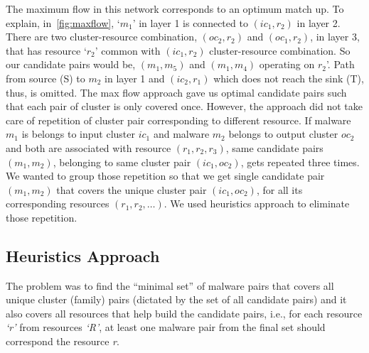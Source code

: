 The maximum flow in this network corresponds to an optimum match up.
To explain, in~\autoref{fig:maxflow}, `$m_1$' in layer 1 is connected to $(ic_1,r_2)$ in layer 2.
There are two cluster-resource combination, $(oc_2,r_2)$ and $(oc_1,r_2)$, in layer 3, that has resource `$r_2$' common with $(ic_1,r_2)$ cluster-resource combination.
So our candidate pairs would be, $(m_1,m_5)$ and $(m_1,m_4)$ operating on $r_2$'.
Path from source (S) to $m_2$ in layer 1 and $(ic_2,r_1)$ which does not reach the sink (T), thus, is omitted.
The max flow approach gave us optimal candidate pairs such that each pair of cluster is only covered once.
However, the approach did not take care of repetition of cluster pair corresponding to different resource.
If malware $m_1$ is belongs to input cluster $ic_1$ and malware $m_2$ belongs to output cluster $oc_2$ and both are associated with resource $(r_1,r_2,r_3)$, same candidate pairs $(m_1,m_2)$, belonging to same cluster pair $(ic_1,oc_2)$, gets repeated three times.
We wanted to group those repetition so that we get single candidate pair $(m_1,m_2)$ that covers the unique cluster pair $(ic_1,oc_2)$, for all its corresponding resources $(r_1,r_2,\ldots)$.
We used heuristics approach to eliminate those repetition.
\subsection{Heuristics Approach}
\label{sub:Heuristics Approach}
The problem was to find the ``minimal set'' of malware pairs that covers all unique cluster (family) pairs (dictated by the set of all candidate pairs) and it also covers all resources that help build the candidate pairs, i.e., for each resource \emph{`r'} from resources \emph{`R'}, at least one malware pair from the final set should correspond the resource \emph{r}.\\

